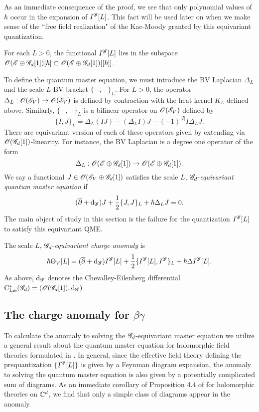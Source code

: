 As an immediate consequence of the proof, we see that only polynomial values of $\hbar$ occur in the expansion of $I^{\mathscr G}[L]$. 
This fact will be used later on when we make sense of the ``free field realization" of the Kac-Moody granted by this equivariant quantization. 

\begin{cor}
For each $L > 0$, the functional $I^{\mathscr G}[L]$ lies in the subspace $\mathscr O(\mathscr E \oplus \mathscr G_d[1]) [\hbar] \subset \mathscr O(\mathscr E \oplus \mathscr G_d[1]) [[\hbar]]$. 
\end{cor}

To define the quantum master equation, we must introduce the BV Laplacian $\Delta_L$ and the scale $L$ BV bracket $\{-,-\}_L$. 
For $L > 0$, the operator $\Delta_L : \mathscr O(\mathscr E_V) \to \mathscr O(\mathscr E_V)$ is defined by contraction with the heat kernel $K_L$ defined above. 
Similarly, $\{-,-\}_L$ is a bilinear operator on $\mathscr O(\mathscr E_V)$ defined by
\[
\{I,J\}_L = \Delta_L(IJ) - (\Delta_L I)J - (-1)^{|I|} I \Delta_L J .
\] 
There are equivariant version of each of these operators given by extending via $\mathscr O(\mathscr G_d[1])$-linearity.
For instance, the BV Laplacian is a degree one operator of the form
\[
\Delta_L : \mathscr O(\mathscr E \oplus \mathscr G_d[1]) \to \mathscr O(\mathscr E \oplus \mathscr G_d[1]) .
\]
We say a functional $J \in \mathscr O(\mathscr E_V \oplus \mathscr G_d[1])$ satisfies the scale $L$, $\mathscr G_d$-{\em equivariant quantum master equation} if
\[
(\overline{\partial} + {\rm d}_{\mathscr G}) J+ \frac{1}{2} \{J, J\}_L + \hbar \Delta_L J = 0 .
\]
The main object of study in this section is the failure for the quantization $I^{\mathscr G}[L]$ to satisfy this equivariant QME. 

\begin{dfn}
The scale $L$, $\mathscr G_d$-{\em equivariant charge anomaly} is
\[
\hbar \Theta_V [L] = (\overline{\partial} + {\rm d}_{\mathscr G}) I^{\mathscr G} [L] + \frac{1}{2} \{I^{\mathscr G}[L], I^{\mathscr G}\}_L + \hbar \Delta I^{\mathscr G}[L] .
\]
As above, ${\rm d}_{\mathscr G}$ denotes the Chevalley-Eilenberg differential ${\rm C}_{{\rm Lie}}^*(\mathscr G_d) = \left(\mathscr O(\mathscr G_d[1]), {\rm d}_{\mathscr G}\right)$. 
\end{dfn}

\subsection{The charge anomaly for $\beta\gamma$}

To calculate the anomaly to solving the $\mathscr G_d$-equivariant master equation we utilize a general result about the quantum master equation for holomorphic field theories formulated in \cite{BWhol}. 
In general, since the effective field theory defining the prequantization $\{I^{\mathscr G}[L]\}$ is given by a Feynman diagram expansion, the anomaly to solving the quantum master equation is also given by a potentially complicated sum of diagrams. 
As an immediate corollary of Proposition 4.4 of \cite{BWhol} for holomorphic theories on $\mathbb C^d$, we find that only a simple class of diagrams appear in the anomaly. 

